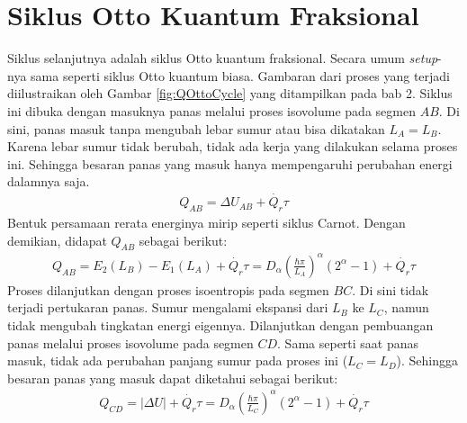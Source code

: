 \section{Siklus Otto Kuantum Fraksional}
Siklus selanjutnya adalah siklus Otto kuantum fraksional. Secara umum \textit{setup}-nya sama seperti siklus Otto kuantum biasa. Gambaran dari proses yang terjadi diilustraikan oleh Gambar \ref{fig:QOttoCycle} yang ditampilkan pada bab 2. Siklus ini dibuka dengan masuknya panas melalui proses isovolume pada segmen \(AB\). Di sini, panas masuk tanpa mengubah lebar sumur atau bisa dikatakan \(L_A=L_B\). Karena lebar sumur tidak berubah, tidak ada kerja yang dilakukan selama proses ini. Sehingga besaran panas yang masuk hanya mempengaruhi perubahan energi dalamnya saja.
\begin{align}
    Q_{AB} = \Delta U_{AB} + \dot{Q_r}\tau
\end{align}
Bentuk persamaan rerata energinya mirip seperti siklus Carnot. Dengan demikian, didapat \(Q_{AB}\) sebagai berikut:
\begin{align}
    Q_{AB} = E_2(L_B) - E_1(L_A) + \dot{Q_r}\tau = D_\alpha\left(\frac{\hbar\pi}{L_A}\right)^\alpha (2^\alpha - 1) + \dot{Q_r}\tau \label{eq:FracOttoQab}
\end{align}
Proses dilanjutkan dengan proses isoentropis pada segmen \(BC\). Di sini tidak terjadi pertukaran panas. Sumur mengalami ekspansi dari \(L_B\) ke \(L_C\), namun tidak mengubah tingkatan energi eigennya. Dilanjutkan dengan pembuangan panas melalui proses isovolume pada segmen \(CD\). Sama seperti saat panas masuk, tidak ada perubahan panjang sumur pada proses ini (\(L_C = L_D\)). Sehingga besaran panas yang masuk dapat diketahui sebagai berikut:
\begin{align}
    Q_{CD} = |\Delta U| + \dot{Q_r}\tau = D_\alpha\left(\frac{\hbar\pi}{L_C}\right)^\alpha (2^\alpha - 1) + \dot{Q_r}\tau \label{eq:FracOttoQcd}
\end{align}

